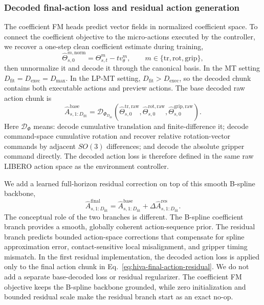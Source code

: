\documentclass[10pt,twocolumn,letterpaper]{article}
\begin{document}
\subsubsection*{Decoded final-action loss and residual action generation}
The coefficient FM heads predict vector fields in normalized coefficient space. To connect the coefficient objective to the micro-actions executed by the controller, we recover a one-step clean coefficient estimate during training,
\begin{equation}
\hat\Theta_{s,0}^{m,\mathrm{norm}}
=
\Theta_{s,t}^m-t v_\theta^m,
\qquad
m\in\{\mathrm{tr},\mathrm{rot},\mathrm{grip}\},
\end{equation}
then unnormalize it and decode it through the canonical basis. In the MT setting $D_{\mathrm{fit}}=D_{\mathrm{exec}}=D_{\max}$. In the LP-MT setting, $D_{\mathrm{fit}}>D_{\mathrm{exec}}$, so the decoded chunk contains both executable actions and preview actions. The base decoded raw action chunk is
\begin{equation}
\hat A^{\mathrm{base}}_{s,1:D_{\mathrm{fit}}}
=\mathcal{D}_{\Phi_{D_{\mathrm{fit}}}}
\left(
\hat\Theta_{s,0}^{\mathrm{tr},\mathrm{raw}},
\hat\Theta_{s,0}^{\mathrm{rot},\mathrm{raw}},
\hat\Theta_{s,0}^{\mathrm{grip},\mathrm{raw}}
\right).
\end{equation}
Here $\mathcal{D}_{\Phi}$ means: decode cumulative translation and finite-difference it; decode command-space cumulative rotation and recover relative rotation-vector commands by adjacent $SO(3)$ differences; and decode the absolute gripper command directly. The decoded action loss is therefore defined in the same raw LIBERO action space as the environment controller.

We add a learned full-horizon residual correction on top of this smooth B-spline backbone,
\begin{equation}
\hat A^{\mathrm{final}}_{s,1:D_{\mathrm{fit}}}
=
\hat A^{\mathrm{base}}_{s,1:D_{\mathrm{fit}}}
+
\Delta \hat A^{\mathrm{res}}_{s,1:D_{\mathrm{fit}}}.
\label{eq:hiva-final-action-residual}
\end{equation}
The conceptual role of the two branches is different. The B-spline coefficient branch provides a smooth, globally coherent action-sequence prior. The residual branch predicts bounded action-space corrections that compensate for spline approximation error, contact-sensitive local misalignment, and gripper timing mismatch. In the first residual implementation, the decoded action loss is applied only to the final action chunk in Eq.~\eqref{eq:hiva-final-action-residual}. We do not add a separate base-decoded loss or residual regularizer. The coefficient FM objective keeps the B-spline backbone grounded, while zero initialization and bounded residual scale make the residual branch start as an exact no-op.
\end{document}
